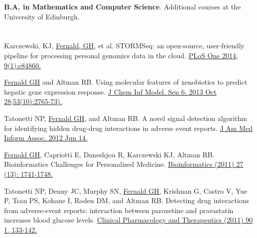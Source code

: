 \begin{resume}
\title{}
\dates{}
\begin{position}
\vspace{1.5em}
\begin{listitems}

    \item \textbf{B.A. in Mathematics and Computer Science}.  Additional courses at the University of Edinburgh.

\end{listitems}
\end{position}



\section{}
\raggedright

Karczewski, KJ, \underline{Fernald, GH}, et al. STORMSeq: an open-source, user-friendly pipeline for processing personal genomics data in the cloud. \href{http://www.ncbi.nlm.nih.gov/entrez/query.fcgi?db=pubmed&cmd=Retrieve&dopt=AbstractPlus&list_uids= 24454756}{PLoS One 2014, 9(1):e84860.}

\underline{Fernald GH} and Altman RB.  Using molecular features of xenobiotics to predict hepatic gene expression response.  \href{http://www.ncbi.nlm.nih.gov/entrez/query.fcgi?db=pubmed&cmd=Retrieve&dopt=AbstractPlus&list_uids=24010729}{J Chem Inf Model. Sep 6. 2013 Oct 28;53(10):2765-73).}

Tatonetti NP, \underline{Fernald GH}, and Altman RB. A novel signal detection algorithm for identifying hidden drug-drug interactions in adverse event reports.
\href{http://www.ncbi.nlm.nih.gov/entrez/query.fcgi?db=pubmed&cmd=Retrieve&dopt=AbstractPlus&list_uids=21613990}{J Am Med Inform Assoc. 2012 Jun 14.}

\underline{Fernald GH}, Capriotti E, Daneshjou R, Karczewski KJ,
Altman RB.  Bioinformatics Challenges for Personalized Medicine.
\href{http://www.ncbi.nlm.nih.gov/entrez/query.fcgi?db=pubmed&cmd=Retrieve&dopt=AbstractPlus&list_uids=21596790}{Bioinformatics (2011) 27 (13): 1741-1748.}

Tatonetti NP, Denny JC, Murphy SN, \underline{Fernald GH}, Krishnan G, Castro V, Yue P, Tsau PS, Kohane I, Roden DM, and Altman RB.
Detecting drug interactions from adverse-event reports: interaction between paroxetine and pravastatin increases blood glucose levels.
\href{http://www.ncbi.nlm.nih.gov/entrez/query.fcgi?db=pubmed&cmd=Retrieve&dopt=AbstractPlus&list_uids=21613990}{Clinical Pharmacology and Therapeutics (2011) 90 1, 133-142.}


\end{resume}
